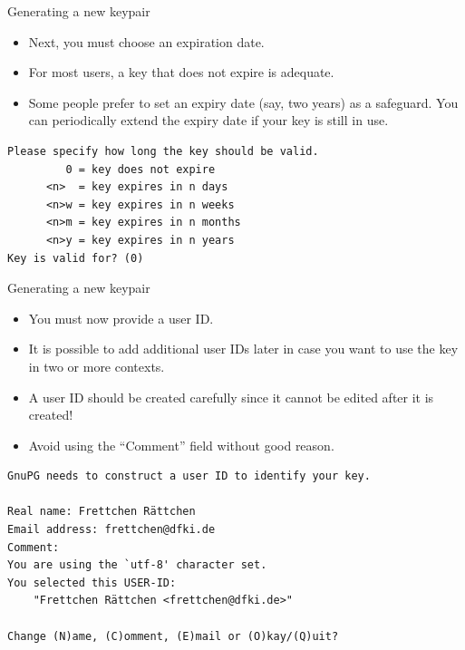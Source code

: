 \documentclass[
mode=present,
paper=smartboard,
size=20pt,
]{powerdot}
\newcommand\vsp{\vspace{-16mm}}
\begin{document}
\begin{slide}[method=direct,toc=]{Generating a new keypair}
  \begin{itemize}
  \item Next, you must choose an expiration date.
  \item For most users, a key that does not expire is adequate.
  \item Some people prefer to set an expiry date (say, two years) as a
    safeguard. You can periodically extend the expiry date if your key
    is still in use.
  \end{itemize}
\begin{verbatim}
Please specify how long the key should be valid.
         0 = key does not expire
      <n>  = key expires in n days
      <n>w = key expires in n weeks
      <n>m = key expires in n months
      <n>y = key expires in n years
Key is valid for? (0)
\end{verbatim}
\end{slide}

\begin{slide}[method=direct,toc=]{Generating a new keypair}
  \begin{itemize}
  \item You must now provide a user ID.
  \item It is possible to add additional user IDs later in case you
    want to use the key in two or more contexts.
  \item A user ID should be created carefully since it cannot be
    edited after it is created!
  \item Avoid using the ``Comment'' field without good reason.
  \end{itemize}
\vsp
\begin{verbatim}
GnuPG needs to construct a user ID to identify your key.

Real name: Frettchen Rättchen
Email address: frettchen@dfki.de
Comment: 
You are using the `utf-8' character set.
You selected this USER-ID:
    "Frettchen Rättchen <frettchen@dfki.de>"

Change (N)ame, (C)omment, (E)mail or (O)kay/(Q)uit?
\end{verbatim}
\end{slide}
\end{document}

